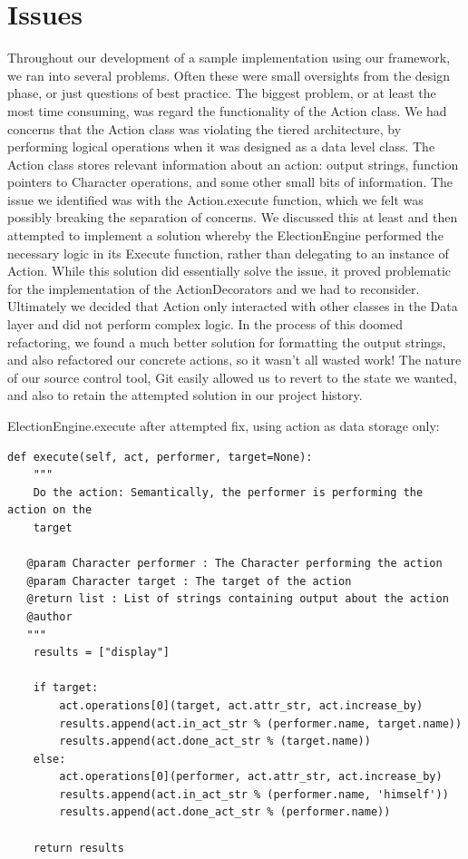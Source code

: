 \documentclass[11pt]{report}
\begin{document}
\section{Issues}
Throughout our development of a sample implementation using our framework, we ran into several problems. Often these were small oversights from the design phase, or just questions of best practice. The biggest problem, or at least the most time consuming, was regard the functionality of the Action class. We had concerns that the Action class was violating the tiered architecture, by performing logical operations when it was designed as a data level class. The Action class stores relevant information about an action: output strings, function pointers to Character operations, and some other small bits of information. The issue we identified was with the Action.execute function, which we felt was possibly breaking the separation of concerns. We discussed this at least and then attempted to implement a solution whereby the ElectionEngine performed the necessary logic in its Execute function, rather than delegating to an instance of Action. While this solution did essentially solve the issue, it proved problematic for the implementation of the ActionDecorators and we had to reconsider. Ultimately we decided that Action only interacted with other classes in the Data layer and did not perform complex logic. In the process of this doomed refactoring, we found a much better solution for formatting the output strings, and also refactored our concrete actions, so it wasn’t all wasted work! The nature of our source control tool, Git easily allowed us to revert to the state we wanted, and also to retain the attempted solution in our project history.

ElectionEngine.execute after attempted fix, using action as data storage only:

\begin{verbatim}
def execute(self, act, performer, target=None):
    """
    Do the action: Semantically, the performer is performing the action on the
    target

   @param Character performer : The Character performing the action
   @param Character target : The target of the action
   @return list : List of strings containing output about the action
   @author
   """
    results = ["display"]
    
    if target:
        act.operations[0](target, act.attr_str, act.increase_by)
        results.append(act.in_act_str % (performer.name, target.name))
        results.append(act.done_act_str % (target.name))
    else:
        act.operations[0](performer, act.attr_str, act.increase_by)
        results.append(act.in_act_str % (performer.name, 'himself'))
        results.append(act.done_act_str % (performer.name))
        
    return results
\end{verbatim}
\end{document}
